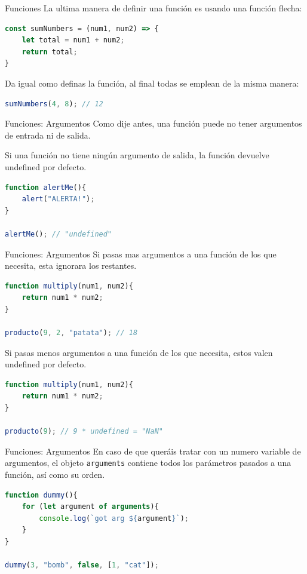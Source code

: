\documentclass{beamer}
\begin{document}
\begin{frame}[fragile]{Funciones}
La ultima manera de definir una función es usando una función flecha:
\begin{lstlisting}[language=JavaScript]
const sumNumbers = (num1, num2) => { 
    let total = num1 + num2; 
    return total;
}\end{lstlisting} \pause

Da igual como definas la función, al final todas se emplean de la misma manera:
\begin{lstlisting}[language=JavaScript]
sumNumbers(4, 8); // 12
\end{lstlisting}
\end{frame}

\begin{frame}[fragile]{Funciones: Argumentos}
Como dije antes, una función puede no tener argumentos de entrada ni de salida.

Si una función no tiene ningún argumento de salida, la función devuelve undefined por defecto.
\begin{lstlisting}[language=JavaScript]
function alertMe(){
    alert("ALERTA!");
}

alertMe(); // "undefined"
\end{lstlisting}
\end{frame}

\begin{frame}[fragile]{Funciones: Argumentos}
Si pasas mas argumentos a una función de los que necesita, esta ignorara los restantes.
\begin{lstlisting}[language=JavaScript]
function multiply(num1, num2){
    return num1 * num2;
}

producto(9, 2, "patata"); // 18
\end{lstlisting} \pause

Si pasas menos argumentos a una función de los que necesita, estos valen undefined por defecto.
\begin{lstlisting}[language=JavaScript]
function multiply(num1, num2){
    return num1 * num2;
}

producto(9); // 9 * undefined = "NaN"
\end{lstlisting}
\end{frame}

\begin{frame}[fragile]{Funciones: Argumentos}
En caso de que queráis tratar con un numero variable de argumentos, el objeto {\verb|arguments|} contiene todos los parámetros pasados a una función, así como su orden.

\begin{lstlisting}[language=JavaScript]
function dummy(){
    for (let argument of arguments){
        console.log(`got arg ${argument}`);
    }
}

dummy(3, "bomb", false, [1, "cat"]);
\end{lstlisting}
\end{frame}
\end{document}
